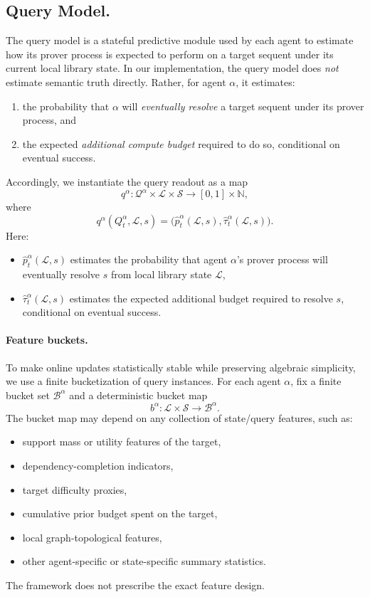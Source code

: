 \documentclass[letterpaper]{article} %
\begin{document}
\subsection{Query Model.}

The query model is a stateful predictive module used by each agent to estimate how its prover process is expected to perform on a target sequent under its current local library state. In our implementation, the query model does \emph{not} estimate semantic truth directly. Rather, for agent $\alpha$, it estimates:

\begin{enumerate}
    \item the probability that $\alpha$ will \emph{eventually resolve} a target sequent under its prover process, and
    \item the expected \emph{additional compute budget} required to do so, conditional on eventual success.
\end{enumerate}

Accordingly, we instantiate the query readout as a map
\[
q^\alpha : \mathcal Q^\alpha \times \mathscr L \times \mathcal S \to [0,1]\times \mathbb N,
\]
where
\[
q^\alpha(Q^\alpha_t,\mathcal L,s)
=
\big(\hat p^\alpha_t(\mathcal L,s),\hat \tau^\alpha_t(\mathcal L,s)\big).
\]
Here:
\begin{itemize}
    \item $\hat p^\alpha_t(\mathcal L,s)$ estimates the probability that agent $\alpha$'s prover process will eventually resolve $s$ from local library state $\mathcal L$,
    \item $\hat\tau^\alpha_t(\mathcal L,s)$ estimates the expected additional budget required to resolve $s$, conditional on eventual success.
\end{itemize}

\paragraph{Feature buckets.}
To make online updates statistically stable while preserving algebraic simplicity, we use a finite bucketization of query instances. For each agent $\alpha$, fix a finite bucket set $\mathcal B^\alpha$ and a deterministic bucket map
\[
b^\alpha : \mathscr L\times \mathcal S \to \mathcal B^\alpha.
\]
The bucket map may depend on any collection of state/query features, such as:
\begin{itemize}
    \item support mass or utility features of the target,
    \item dependency-completion indicators,
    \item target difficulty proxies,
    \item cumulative prior budget spent on the target,
    \item local graph-topological features,
    \item other agent-specific or state-specific summary statistics.
\end{itemize}
The framework does not prescribe the exact feature design.
\end{document}
